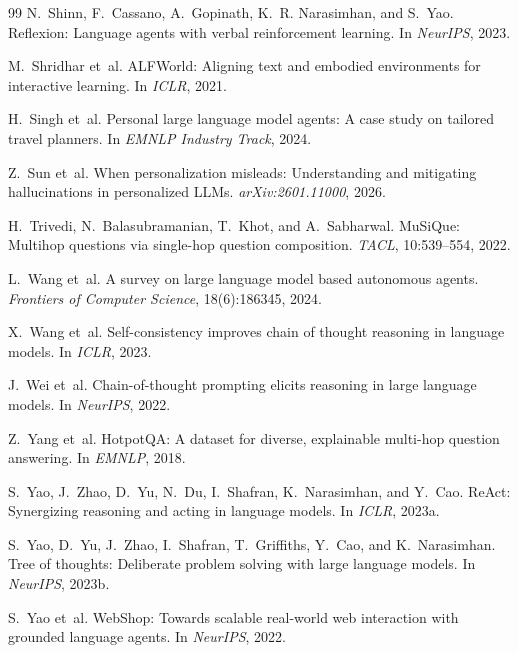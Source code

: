 \begin{thebibliography}{99}
N.~Shinn, F.~Cassano, A.~Gopinath, K.~R. Narasimhan, and S.~Yao.
\newblock Reflexion: Language agents with verbal reinforcement learning.
\newblock In \emph{NeurIPS}, 2023.

M.~Shridhar et~al.
\newblock ALFWorld: Aligning text and embodied environments for interactive learning.
\newblock In \emph{ICLR}, 2021.

H.~Singh et~al.
\newblock Personal large language model agents: A case study on tailored travel planners.
\newblock In \emph{EMNLP Industry Track}, 2024.

Z.~Sun et~al.
\newblock When personalization misleads: Understanding and mitigating hallucinations in personalized LLMs.
\newblock \emph{arXiv:2601.11000}, 2026.

H.~Trivedi, N.~Balasubramanian, T.~Khot, and A.~Sabharwal.
\newblock MuSiQue: Multihop questions via single-hop question composition.
\newblock \emph{TACL}, 10:539--554, 2022.

L.~Wang et~al.
\newblock A survey on large language model based autonomous agents.
\newblock \emph{Frontiers of Computer Science}, 18(6):186345, 2024.

X.~Wang et~al.
\newblock Self-consistency improves chain of thought reasoning in language models.
\newblock In \emph{ICLR}, 2023.

J.~Wei et~al.
\newblock Chain-of-thought prompting elicits reasoning in large language models.
\newblock In \emph{NeurIPS}, 2022.

Z.~Yang et~al.
\newblock HotpotQA: A dataset for diverse, explainable multi-hop question answering.
\newblock In \emph{EMNLP}, 2018.

S.~Yao, J.~Zhao, D.~Yu, N.~Du, I.~Shafran, K.~Narasimhan, and Y.~Cao.
\newblock ReAct: Synergizing reasoning and acting in language models.
\newblock In \emph{ICLR}, 2023a.

S.~Yao, D.~Yu, J.~Zhao, I.~Shafran, T.~Griffiths, Y.~Cao, and K.~Narasimhan.
\newblock Tree of thoughts: Deliberate problem solving with large language models.
\newblock In \emph{NeurIPS}, 2023b.

S.~Yao et~al.
\newblock WebShop: Towards scalable real-world web interaction with grounded language agents.
\newblock In \emph{NeurIPS}, 2022.

\end{thebibliography}
